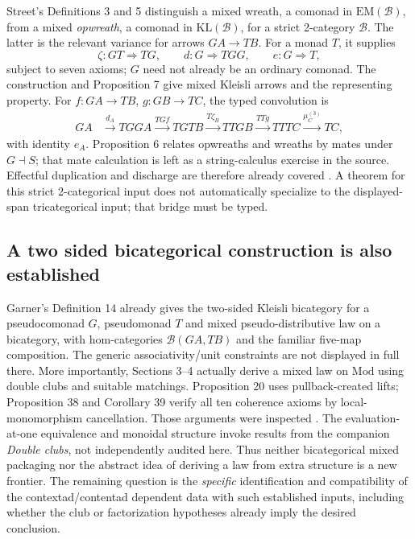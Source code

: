 \documentclass[11pt,a4paper]{article}
\begin{document}
Street's Definitions 3 and 5 distinguish a mixed wreath, a comonad in
\(\mathrm{EM}(\mathcal B)\), from a mixed \emph{opwreath}, a comonad in
\(\mathrm{KL}(\mathcal B)\), for a strict 2-category \(\mathcal B\). The latter
is the relevant variance for arrows \(GA\to TB\). For a monad \(T\), it supplies
\[
 \zeta:GT\Rightarrow TG,\qquad
 d:G\Rightarrow TGG,\qquad e:G\Rightarrow T,
\]
subject to seven axioms; \(G\) need not already be an ordinary comonad.
The construction and Proposition 7 give mixed Kleisli arrows and the representing
property. For \(f:GA\to TB\), \(g:GB\to TC\), the typed convolution is
\begin{align*}
 GA&\xrightarrow{d_A}TGGA\xrightarrow{TGf}TGTB
 \xrightarrow{T\zeta_B}TTGB\xrightarrow{TTg}TTTC
 \xrightarrow{\mu_C^{(3)}}TC,
\end{align*}
with identity \(e_A\). Proposition 6 relates opwreaths and wreaths by mates under
\(G\dashv S\); that mate calculation is left as a string-calculus exercise in
the source. Effectful duplication and discharge are therefore already covered
\cite{Street}. A theorem for this strict 2-categorical input does not automatically
specialize to the displayed-span tricategorical input; that bridge must be typed.

\subsection{A two sided bicategorical construction is also established}

Garner's Definition 14 already gives the two-sided Kleisli bicategory for a
pseudocomonad \(G\), pseudomonad \(T\) and mixed pseudo-distributive law on a
bicategory, with hom-categories \(\mathcal B(GA,TB)\) and the familiar five-map
composition. The generic associativity/unit constraints are not displayed in
full there. More importantly, Sections 3--4 actually derive a mixed law on
\(\mathrm{Mod}\) using double clubs and suitable matchings. Proposition 20 uses
pullback-created lifts; Proposition 38 and Corollary 39 verify all ten coherence
axioms by local-monomorphism cancellation. Those arguments were inspected
\cite{Garner}. The evaluation-at-one equivalence and monoidal structure invoke
results from the companion \emph{Double clubs}, not independently audited here.
Thus neither bicategorical mixed packaging nor the abstract idea of deriving a
law from extra structure is a new frontier. The remaining question is the
\emph{specific} identification and compatibility of the contextad/contentad
dependent data with such established inputs, including whether the club or
factorization hypotheses already imply the desired conclusion.
\end{document}
